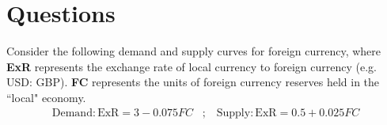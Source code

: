 \documentclass[12pt]{exam}
\begin{document}
\section*{Questions}
\begin{questions}

\question 
Consider the following demand and supply curves for foreign currency, where \textbf{ExR} represents the exchange rate of local currency to foreign currency (e.g. USD: GBP).
\textbf{FC} represents the units of foreign currency reserves held in the ``local" economy.
\vspace*{-0.2cm}
\begin{align*}
    \text{Demand}: \text{ExR} = 3 - 0.075FC \;\;\; ; \;\;\; \text{Supply}: \text{ExR} = 0.5 + 0.025FC      
\end{align*}

\end{questions}
\end{document}
